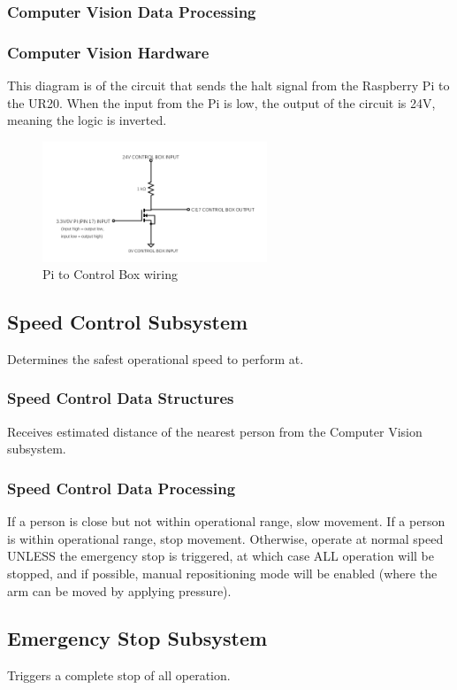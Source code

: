 \subsubsection{Computer Vision Data Processing}

\subsubsection{Computer Vision Hardware}
This diagram is of the circuit that sends the halt signal from the Raspberry Pi to the UR20. When the input from the Pi is low, the output of the circuit is 24V, meaning the logic is inverted.
\begin{figure}[h!]
	\centering
 	\includegraphics[width=0.60\textwidth]{images/piCircuit.png}
 \caption{Pi to Control Box wiring}
\end{figure}

\subsection{Speed Control Subsystem}
Determines the safest operational speed to perform at.

\subsubsection{Speed Control Data Structures}
Receives estimated distance of the nearest person from the Computer Vision subsystem.

\subsubsection{Speed Control Data Processing}
If a person is close but not within operational range, slow movement. If a person is within operational range, stop movement. Otherwise, operate at normal speed UNLESS the emergency stop is triggered, at which case ALL operation will be stopped, and if possible, manual repositioning mode will be enabled (where the arm can be moved by applying pressure).

\subsection{Emergency Stop Subsystem}
Triggers a complete stop of all operation.

